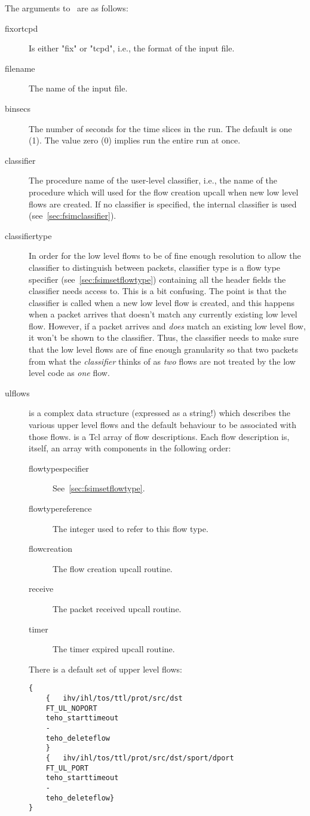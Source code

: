 \documentclass{article}
\begin{document}
The arguments to \cmdname\ are as follows:
\begin{description}
\item[fixortcpd] Is either "fix" or "tcpd", i.e., the format of the
input file.
\item[filename] The name of the input file.
\item[binsecs] The number of seconds for the time slices in the run.
The default is one (1).  The value zero (0) implies run the entire run
at once.
\item[classifier] The procedure name of the user-level classifier,
i.e., the name of the procedure which will used for the flow creation
upcall when new low level flows are created.  If no classifier is
specified, the internal classifier  is used
(see~\ref{sec:fsimclassifier}).
\item[classifiertype] In order for the low level flows to be of fine
enough resolution to allow the classifier to distinguish between
packets, classifier type is a flow type specifier
(see~\ref{sec:fsimsetflowtype}) containing all the header fields the
classifier needs access to.  This is a bit confusing.  The point is
that the classifier is called when a new low level flow is created, and
this happens when a packet arrives that doesn't match any currently
existing low level flow.  However, if a packet arrives and \emph{does}
match an existing low level flow, it won't be shown to the classifier.
Thus, the classifier needs to make sure that the low level flows are
of fine enough granularity so that two packets from what the
\emph{classifier} thinks of as \emph{two} flows are not treated by the
low level code as \emph{one} flow.
\item[ulflows]   is a complex data structure (expressed
as a string!) which describes the various upper level flows and the
default behaviour to be associated with those flows.  
is a Tcl array of flow descriptions.  Each flow description is, itself,
an array with components in the following order:
\begin{description}
\item[flowtypespecifier] See~\ref{sec:fsimsetflowtype}.
\item[flowtypereference] The integer used to refer to this flow type.
\item[flowcreation] The flow creation upcall routine.
\item[receive] The packet received upcall routine.
\item[timer] The timer expired upcall routine.
\end{description}
There is a default set of upper level flows:
\begin{verbatim}
{
    {   ihv/ihl/tos/ttl/prot/src/dst
	FT_UL_NOPORT
	teho_starttimeout
	-
	teho_deleteflow
    }
    {	ihv/ihl/tos/ttl/prot/src/dst/sport/dport
	FT_UL_PORT
	teho_starttimeout
	-
	teho_deleteflow}
}
\end{verbatim}
\end{description}
\end{document}
